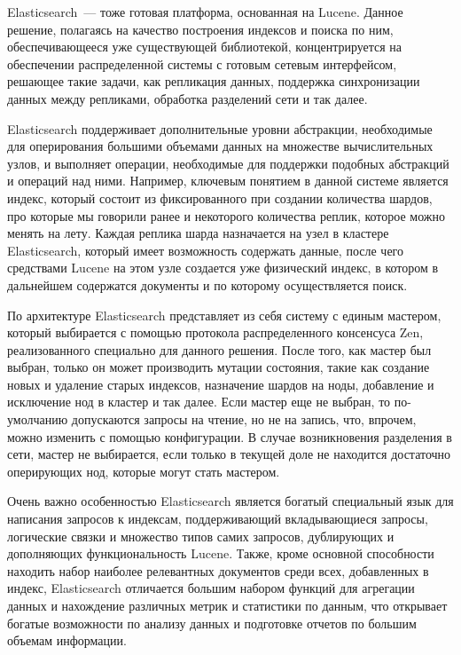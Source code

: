 Elasticsearch~--- тоже готовая платформа, основанная на Lucene. Данное решение, полагаясь на качество построения индексов и поиска по ним, обеспечивающееся уже существующей библиотекой, концентрируется на обеспечении распределенной системы с готовым сетевым интерфейсом, решающее такие задачи, как репликация данных, поддержка синхронизации данных между репликами, обработка разделений сети и так далее.

Elasticsearch поддерживает дополнительные уровни абстракции, необходимые для оперирования большими объемами данных на множестве вычислительных узлов, и выполняет операции, необходимые для поддержки подобных абстракций и операций над ними. Например, ключевым понятием в данной системе является индекс, который состоит из фиксированного при создании количества шардов, про которые мы говорили ранее и некоторого количества реплик, которое можно менять на лету. Каждая реплика шарда назначается на узел в кластере Elasticsearch, который имеет возможность содержать данные, после чего средствами Lucene на этом узле создается уже физический индекс, в котором в дальнейшем содержатся документы и по которому осуществляется поиск.

По архитектуре Elasticsearch представляет из себя систему с единым мастером, который выбирается с помощью протокола распределенного консенсуса Zen, реализованного специально для данного решения. После того, как мастер был выбран, только он может производить мутации состояния, такие как создание новых и удаление старых индексов, назначение шардов на ноды, добавление и исключение нод в кластер и так далее. Если мастер еще не выбран, то по-умолчанию допускаются запросы на чтение, но не на запись, что, впрочем, можно изменить с помощью конфигурации. В случае возникновения разделения в сети, мастер не выбирается, если только в текущей доле не находится достаточно оперирующих нод, которые могут стать мастером.

Очень важно особенностью Elasticsearch является богатый специальный язык для написания запросов к индексам, поддерживающий вкладывающиеся запросы, логические связки и множество типов самих запросов, дублирующих и дополняющих функциональность Lucene. Также, кроме основной способности находить набор наиболее релевантных документов среди всех, добавленных в индекс, Elasticsearch отличается большим набором функций для агрегации данных и нахождение различных метрик и статистики по данным, что открывает богатые возможности по анализу данных и подготовке отчетов по большим объемам информации.

